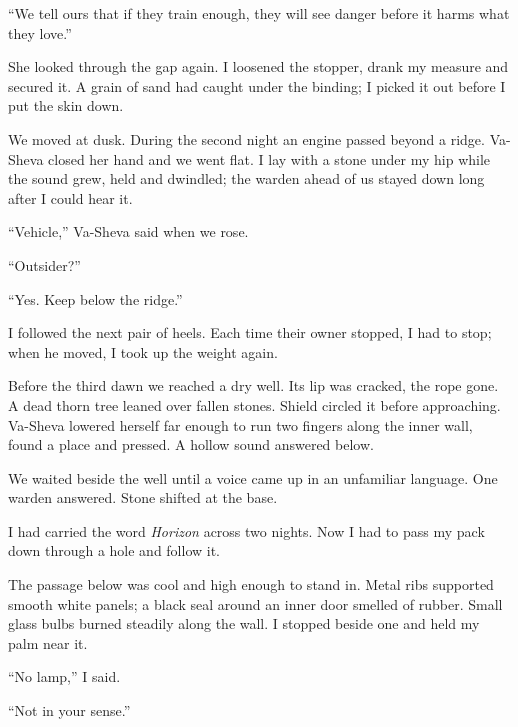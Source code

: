 ``We tell ours that if they train enough, they will see danger before it harms what they love.''\par

She looked through the gap again. I loosened the stopper, drank my measure and secured it. A grain of sand had caught under the binding; I picked it out before I put the skin down.\par

We moved at dusk. During the second night an engine passed beyond a ridge. Va-Sheva closed her hand and we went flat. I lay with a stone under my hip while the sound grew, held and dwindled; the warden ahead of us stayed down long after I could hear it.\par

``Vehicle,'' Va-Sheva said when we rose.\par

``Outsider?''\par

``Yes. Keep below the ridge.''\par

I followed the next pair of heels. Each time their owner stopped, I had to stop; when he moved, I took up the weight again.\par

Before the third dawn we reached a dry well. Its lip was cracked, the rope gone. A dead thorn tree leaned over fallen stones. Shield circled it before approaching. Va-Sheva lowered herself far enough to run two fingers along the inner wall, found a place and pressed. A hollow sound answered below.\par

We waited beside the well until a voice came up in an unfamiliar language. One warden answered. Stone shifted at the base.\par

I had carried the word \textit{Horizon} across two nights. Now I had to pass my pack down through a hole and follow it.\par

The passage below was cool and high enough to stand in. Metal ribs supported smooth white panels; a black seal around an inner door smelled of rubber. Small glass bulbs burned steadily along the wall. I stopped beside one and held my palm near it.\par

``No lamp,'' I said.\par

``Not in your sense.''\par


